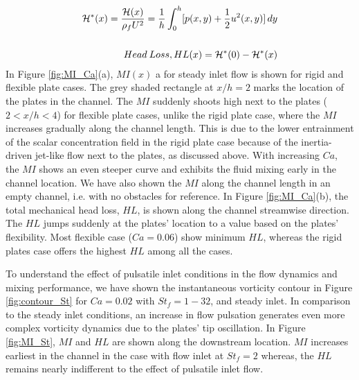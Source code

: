 \documentclass[%
 aip,
 amsmath,amssymb,
 reprint,
]{revtex4-1}
\begin{document}
\begin{eqnarray*}
	\mathcal{H}^*(x)=\frac{\mathcal{H}(x)}{\rho_f U^2}=\frac{1}{h}\int_{0}^{h}[p(x,y)+{1\over2}  u^2(x,y)]\,dy \\ \\Head \: Loss, HL(x) = \mathcal{H}^*(0)-\mathcal{H}^*(x)
\end{eqnarray*}
In Figure \ref{fig:MI_Ca}(a), $MI(x)$ a for steady inlet flow is shown for rigid and flexible plate cases. The grey shaded rectangle at $x/h=2$ marks the location of the plates in the channel. The $MI$ suddenly shoots high next to the plates ($2<x/h<4$) for flexible plate cases, unlike the rigid plate case, where the $MI$ increases gradually along the channel length. This is due to the lower entrainment of the scalar concentration field in the rigid plate case because of the inertia-driven jet-like flow next to the plates, as discussed above. With increasing $Ca$, the $MI$ shows an even steeper curve and exhibits the fluid mixing early in the channel location. We have also shown the $MI$ along the channel length in an empty channel, i.e. with no obstacles for reference. In Figure \ref{fig:MI_Ca}(b), the total mechanical head loss, $HL$, is shown along the channel streamwise direction. The $HL$ jumps suddenly at the plates' location to a value based on the plates' flexibility. Most flexible case ($Ca=0.06$) show minimum $HL$, whereas the rigid plates case offers the highest $HL$ among all the cases.

To understand the effect of pulsatile inlet conditions in the flow dynamics and mixing performance, we have shown the instantaneous vorticity contour in Figure \ref{fig:contour_St} for $Ca=0.02$ with $St_f=1-32$, and steady inlet. In comparison to the steady inlet conditions, an increase in flow pulsation generates even more complex vorticity dynamics due to the plates' tip oscillation.
In Figure \ref{fig:MI_St}, $MI$ and $HL$ are shown along the downstream location. $MI$ increases earliest in the channel in the case with flow inlet at $St_f=2$ whereas, the $HL$ remains nearly indifferent to the effect of pulsatile inlet flow.
\end{document}
